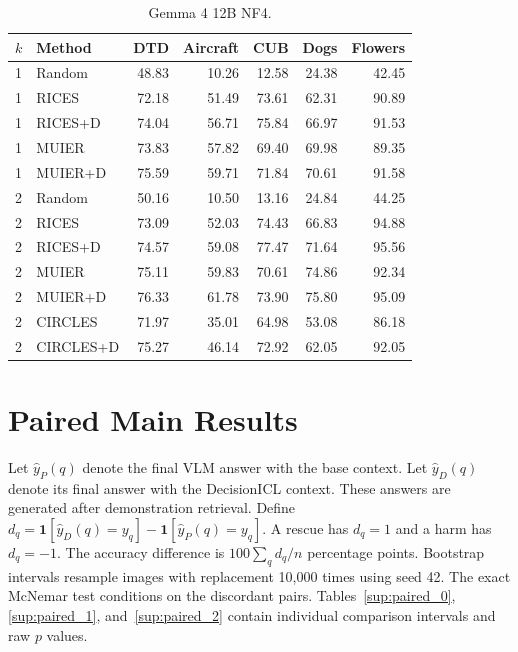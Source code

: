 \documentclass[10pt,twocolumn,letterpaper]{article}
\newcommand{\method}{DecisionICL\xspace}
\begin{document}
\begin{table}[t]
\caption{Gemma 4 12B NF4.}
\label{sup:full_main_2}
\centering\small
\begin{tabular}{llrrrrr}
\toprule
$k$ & Method & DTD & Aircraft & CUB & Dogs & Flowers \\
\midrule
1 & Random & 48.83 & 10.26 & 12.58 & 24.38 & 42.45 \\
1 & RICES & 72.18 & 51.49 & 73.61 & 62.31 & 90.89 \\
1 & RICES+D & 74.04 & 56.71 & 75.84 & 66.97 & 91.53 \\
1 & MUIER & 73.83 & 57.82 & 69.40 & 69.98 & 89.35 \\
1 & MUIER+D & 75.59 & 59.71 & 71.84 & 70.61 & 91.58 \\
2 & Random & 50.16 & 10.50 & 13.16 & 24.84 & 44.25 \\
2 & RICES & 73.09 & 52.03 & 74.43 & 66.83 & 94.88 \\
2 & RICES+D & 74.57 & 59.08 & 77.47 & 71.64 & 95.56 \\
2 & MUIER & 75.11 & 59.83 & 70.61 & 74.86 & 92.34 \\
2 & MUIER+D & 76.33 & 61.78 & 73.90 & 75.80 & 95.09 \\
2 & CIRCLES & 71.97 & 35.01 & 64.98 & 53.08 & 86.18 \\
2 & CIRCLES+D & 75.27 & 46.14 & 72.92 & 62.05 & 92.05 \\
\bottomrule
\end{tabular}
\end{table}

\section{Paired Main Results}
Let $\hat y_P(q)$ denote the final VLM answer with the base context. Let $\hat y_D(q)$ denote its final answer with the \method context. These answers are generated after demonstration retrieval. Define $d_q=\mathbf{1}[\hat y_D(q)=y_q]-\mathbf{1}[\hat y_P(q)=y_q]$. A rescue has $d_q=1$ and a harm has $d_q=-1$. The accuracy difference is $100\sum_qd_q/n$ percentage points. Bootstrap intervals resample images with replacement 10,000 times using seed 42. The exact McNemar test conditions on the discordant pairs. Tables~\ref{sup:paired_0}, \ref{sup:paired_1}, and~\ref{sup:paired_2} contain individual comparison intervals and raw $p$ values.
\end{document}
